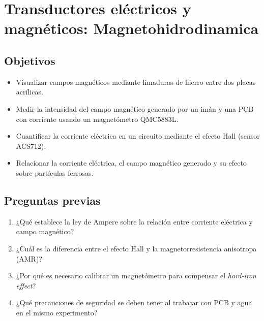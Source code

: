 \chapter{Transductores eléctricos y magnéticos: Magnetohidrodinamica}

\section*{Objetivos}
\begin{itemize}
    \item Visualizar campos magnéticos mediante limaduras de hierro entre dos placas acrílicas.
    \item Medir la intensidad del campo magnético generado por un imán y una PCB con corriente usando un magnetómetro QMC5883L.
    \item Cuantificar la corriente eléctrica en un circuito mediante el efecto Hall (sensor ACS712).
    \item Relacionar la corriente eléctrica, el campo magnético generado y su efecto sobre partículas ferrosas.
\end{itemize}

\section*{Preguntas previas}
\begin{enumerate}
    \item ¿Qué establece la ley de Ampere sobre la relación entre corriente eléctrica y campo magnético?
    \item ¿Cuál es la diferencia entre el efecto Hall y la magnetorresistencia anisotropa (AMR)?
    \item ¿Por qué es necesario calibrar un magnetómetro para compensar el \textit{hard-iron effect}?
    \item ¿Qué precauciones de seguridad se deben tener al trabajar con PCB y agua en el mismo experimento?
\end{enumerate}

